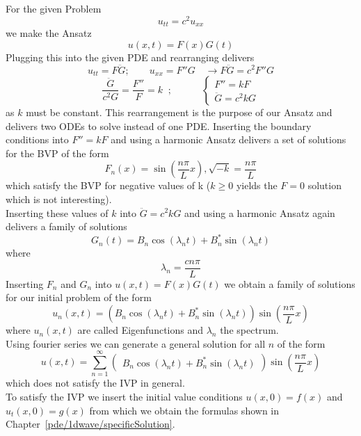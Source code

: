 \begin{examplesection}[Example]
    For the given Problem
    \[ u_{tt}=c^2u_{xx}\]
    we make the Ansatz
    \[u(x,t)=F(x)G(t)\]
    Plugging this into the given PDE and rearranging delivers
    \[u_{tt}=F\ddot{G};\qquad u_{xx}=F''G \quad \rightarrow F\ddot{G}=c^2F''G\]
    \[\frac{\ddot{G}}{c^2G}=\frac{F''}{F}=k\;\; ;\qquad\quad\begin{cases} F''=kF \\
            \ddot{G}=c^2kG
        \end{cases}\]
    as $k$ must be constant. This rearrangement is the purpose of our Ansatz and delivers two ODEs to solve instead of one PDE.
    Inserting the boundary conditions into $F''=kF$ and using a harmonic Ansatz delivers a set of solutions for the BVP of the form
    \[F_n (x)=\sin{\left( \frac{n \pi}{L} x \right) }, \sqrt{-k}=\frac{n \pi}{L}\]
    which satisfy the BVP for negative values of k ($k \ge 0$ yields the $F=0$ solution which is not interesting).\\
    Inserting these values of $k$ into $\ddot{G}=c^2kG$ and using a harmonic Ansatz again delivers a family of solutions
    \[G_n (t) =  B_n \cos{(\lambda_{n} t)} + B_n^* \sin{(\lambda_{n}t)}\]
    where
    \[ \lambda_{n} = \frac{c n \pi}{L} \]
    Inserting $F_n$ and $G_n$ into $u(x,t)=F(x)G(t)$ we obtain a family of solutions for our initial problem of the form
    \[u_n (x, t) = (B_n \cos{(\lambda_{n} t)} + B_n^* \sin{(\lambda_{n}t)})\sin{\left( \frac{n \pi}{L} x \right) } \]
    where $u_n (x, t)$ are called Eigenfunctions and $\lambda_n$ the spectrum.\\
    Using fourier series we can generate a general solution for all $n$ of the form
    \[u(x,t)=\sum\limits_{n=1}^{\infty}\begin{pmatrix}
            B_n \cos(\lambda _n t)+B_n^* \sin(\lambda_n t)
        \end{pmatrix} \sin\left(\frac{n \pi}{L}x \right) \]
    which does not satisfy the IVP in general.\\
    To satisfy the IVP we insert the initial value conditions $u(x,0)=f(x)$ and $u_t(x,0)=g(x)$ from which we obtain the formulas shown in Chapter~\ref{pde/1dwave/specificSolution}.
\end{examplesection}

